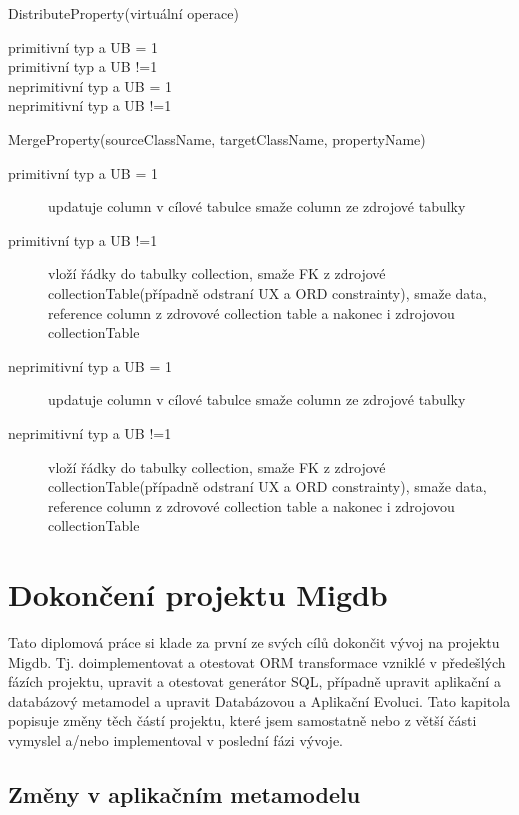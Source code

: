 \documentclass[11pt,twoside,a4paper]{book}
\begin{document}
\begin{list}{Operace :}{}
\item DistributeProperty(virtuální operace) 
\begin{description}
	\item[primitivní typ a UB = 1]
	\item[primitivní typ a UB !=1]
	\item[neprimitivní typ a UB = 1]
	\item[neprimitivní typ a UB !=1]
\end{description}

\item MergeProperty(sourceClassName, targetClassName, propertyName) 
\begin{description}
	\item[primitivní typ a UB = 1] updatuje column v cílové tabulce smaže column ze
	zdrojové tabulky
	\item[primitivní typ a UB !=1] vloží řádky do tabulky collection, smaže FK
	z zdrojové collectionTable(případně odstraní UX a ORD
	constrainty), smaže data, reference column z zdrovové
	collection table a nakonec i zdrojovou collectionTable
	\item[neprimitivní typ a UB = 1] updatuje column v cílové tabulce smaže column ze
	zdrojové tabulky
	\item[neprimitivní typ a UB !=1] vloží řádky do tabulky collection, smaže FK
	z zdrojové collectionTable(případně odstraní UX a ORD
	constrainty), smaže data, reference column z zdrovové
	collection table a nakonec i zdrojovou collectionTable
\end{description}
  
\end{list}

\chapter{Dokončení projektu Migdb}\label{chapt:dokonceni_projektu}
Tato diplomová práce si klade za první ze svých cílů dokončit vývoj na projektu
Migdb.
Tj. doimplementovat a otestovat ORM transformace vzniklé v předešlých fázích
projektu, upravit a otestovat generátor SQL, případně upravit aplikační a
databázový metamodel a upravit Databázovou a Aplikační Evoluci. Tato kapitola
popisuje změny těch částí projektu, které jsem samostatně nebo z větší části
vymyslel a/nebo implementoval v poslední fázi vývoje.

\section{Změny v aplikačním metamodelu}
\end{document}
